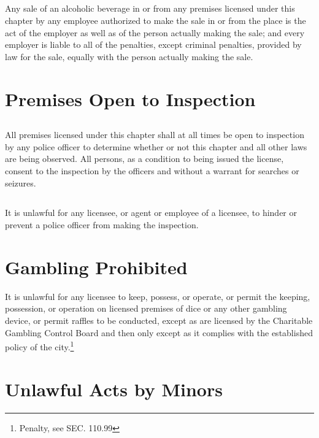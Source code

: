 \subsection{}
Any sale of an alcoholic beverage in or from any premises licensed under this chapter by any employee authorized to make the sale in or from the place is the act of the employer as well as of the person actually making the sale; and every employer is liable to all of the penalties, except criminal penalties, provided by law for the sale, equally with the person actually making the sale.

\section{Premises Open to Inspection}
\subsection{}
All premises licensed under this chapter shall at all times be open to inspection by any police officer to determine whether or not this chapter and all other laws are being observed.  All persons, as a condition to being issued the license, consent to the inspection by the officers and without a warrant for searches or seizures.
\subsection{}
It is unlawful for any licensee, or agent or employee of a licensee, to hinder or prevent a police officer from making the inspection.

\section{Gambling Prohibited}
It is unlawful for any licensee to keep, possess, or operate, or permit the keeping, possession, or operation on licensed premises of dice or any other gambling device, or permit raffles to be conducted, except as are licensed by the Charitable Gambling Control Board and then only except as it complies with the established policy of the city.\footnote{Penalty, see SEC. 110.99}

\section{Unlawful Acts by Minors}
